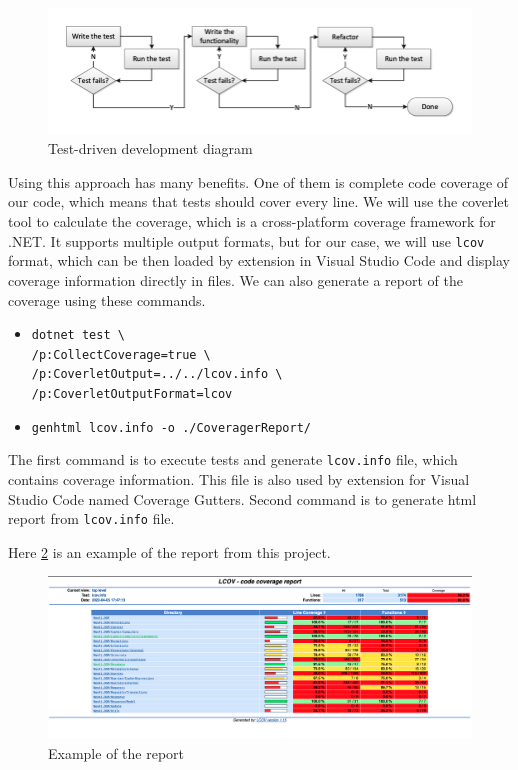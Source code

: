 \begin{figure}[H]
    \centering
    \includegraphics[width=\textwidth]{content/Test-Driven-Development-activities.png}
    \caption{Test-driven development diagram \cite{noauthor_continuous_2013}}
    \label{fig:tddDiagram}
\end{figure}

Using this approach has many benefits. One of them is complete code coverage of our code, which means that tests should cover every line. We will use the coverlet tool to calculate the coverage, which is a cross-platform coverage framework for .NET. \cite{noauthor_coverlet_2022} It supports multiple output
formats, but for our case, we will use \texttt{lcov} format, which can be then loaded by extension in Visual Studio Code and display coverage information directly in files.
We can also generate a report of the coverage using these commands.
\begin{itemize}
    \item {\texttt{dotnet test \textbackslash\\
              /p:CollectCoverage=true \textbackslash\\/p:CoverletOutput=../../lcov.info \textbackslash\\/p:CoverletOutputFormat=lcov}}
    \item {\texttt{genhtml lcov.info -o ./CoveragerReport/}}
\end{itemize}
The first command is to execute tests and generate \texttt{lcov.info} file, which contains coverage information. This file is also used by extension for Visual Studio Code
named Coverage Gutters.
Second command is to generate html report from \texttt{lcov.info} file.

Here \ref{fig:report} is an example of the report from this project.

\begin{figure}[H]
    \centering
    \includegraphics[width=\textwidth]{content/coverage_report.png}
    \caption{Example of the report}
    \label{fig:report}
\end{figure}

